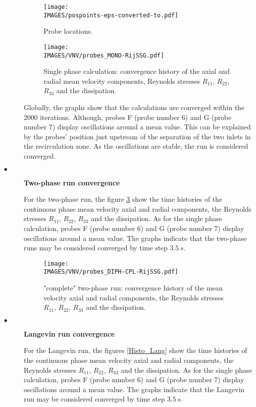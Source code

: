 \begin{description}
         \begin{figure}[H]
            \centerline{\texttt{[image: \\IMAGES/pospoints-eps-converted-to.pdf]}}
            \caption{Probe locations.}
            \label{pospoints}
         \end{figure}

         \begin{figure}[H]
            \centerline{\texttt{[image: \\IMAGES/VNV/probes\_MONO-RijSSG.pdf]}}
            \caption{Single phase calculation: convergence history of the axial and radial mean velocity components, Reynolds stresses $R_{11}$, $R_{22}$, $R_{33}$ and the dissipation.}
            \label{Histo_mono}
         \end{figure}

         Globally, the graphs show that the calculations are converged within the 2000 iterations. Although, probes F (probe number 6) and G (probe number 7) display oscillations around a mean value. This can be explained by the probes' position just upstream of the separation of the two inlets in the recirculation zone. As the oscillations are stable, the run is considered converged.

   \item[$\bullet$]\textbf{Two-phase run convergence}

         For the two-phase run, the figure \ref{Histo_Cplt} show the time histories of the continuous phase mean velocity axial and radial components, the Reynolds stresses $R_{11}$, $R_{22}$, $R_{33}$ and the
         dissipation. As for the single phase calculation, probes F (probe number 6) and G (probe number 7) display oscillations around a mean value.
         The graphs indicate that the two-phase runs may be considered converged by time step $3.5~s$.


         \begin{figure}[H]
            \centerline{\texttt{[image: \\IMAGES/VNV/probes\_DIPH-CPL-RijSSG.pdf]}}
            \caption{"complete" two-phase run: convergence history of the mean velocity axial and radial components, the Reynolds stresses $R_{11}$, $R_{22}$, $R_{33}$ and the dissipation.}
            \label{Histo_Cplt}
         \end{figure}

   \item[$\bullet$]\textbf{Langevin run convergence}

         For the Langevin run, the figures \ref{Histo_Lang} show the time histories of the continuous phase mean velocity axial and radial components, the Reynolds stresses $R_{11}$, $R_{22}$, $R_{33}$ and the
         dissipation. As for the single phase calculation, probes F (probe number 6) and G (probe number 7) display oscillations around a mean value.
         The graphs indicate that the Langevin run may be considered converged by time step $3.5~s$.



\end{description}
